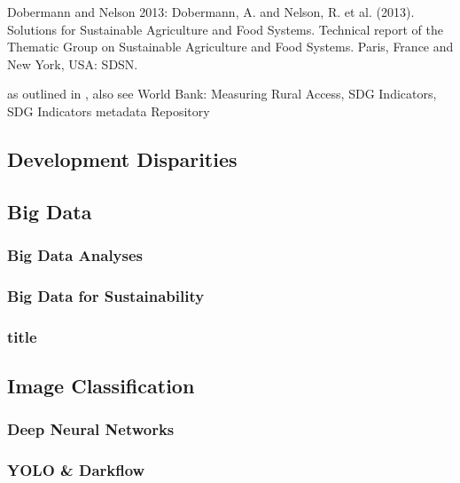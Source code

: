                 \bigskip
	            Dobermann and Nelson 2013: Dobermann, A. and Nelson, R. et al. (2013). Solutions for Sustainable Agriculture and Food Systems. Technical report of the Thematic Group on Sustainable Agriculture and Food Systems. Paris, France and New York, USA: SDSN.
	            
	            \medskip

                as outlined in \cite{sdsn2015}, also see World Bank: Measuring Rural Access, SDG Indicators, SDG Indicators metadata Repository
	            
	            \medskip
	            
		
		
		\subsection{Development Disparities}
		
		
		
		\subsection{Big Data}
			\subsubsection{Big Data Analyses}
			
			\subsubsection{Big Data for Sustainability}
			
			\subsubsection{title}
			
			
			
		\subsection{Image Classification}
			\subsubsection{Deep Neural Networks}
			
			\subsubsection{YOLO \& Darkflow}
			
